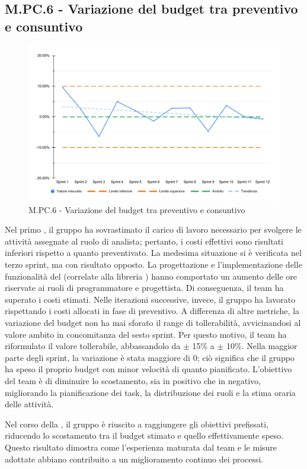 \subsection{M.PC.6 - Variazione del budget tra preventivo e consuntivo}
\begin{figure}[H]
    \centering
    \includegraphics[width=\textwidth]{assets/variazione_budget.pdf}
    \caption{M.PC.6 - Variazione del budget tra preventivo e consuntivo}
\end{figure}

\par Nel primo , il gruppo ha sovrastimato il carico di lavoro necessario per svolgere le attività assegnate al ruolo di analista; pertanto, i costi effettivi sono risultati inferiori rispetto a quanto preventivato. La medesima situazione si è verificata nel terzo sprint, ma con risultato opposto. La progettazione e l’implementazione delle funzionalità del  (correlate alla libreria ) hanno comportato un aumento delle ore riservate ai ruoli di programmatore e progettista. Di conseguenza, il team ha superato i costi stimati. Nelle iterazioni successive, invece, il gruppo ha lavorato rispettando i costi allocati in fase di preventivo. A differenza di altre metriche, la variazione del budget non ha mai sforato il range di tollerabilità, avvicinandosi al valore ambito in concomitanza del sesto sprint. Per questo motivo, il team ha riformulato il valore tollerabile, abbassandolo da $\pm$ 15\% a $\pm$ 10\%. Nella maggior parte degli sprint, la variazione è stata maggiore di 0; ciò significa che il gruppo ha speso il proprio budget con minor velocità di quanto pianificato. L'obiettivo del team è di diminuire lo scostamento, sia in positivo che in negativo, migliorando la pianificazione dei task, la distribuzione dei ruoli e la stima oraria delle attività. 

\par Nel corso della , il gruppo è riuscito a raggiungere gli obiettivi prefissati, riducendo lo scostamento tra il budget stimato e quello effettivamente speso. Questo risultato dimostra come l'esperienza maturata dal team e le misure adottate abbiano contribuito a un miglioramento continuo dei processi.
